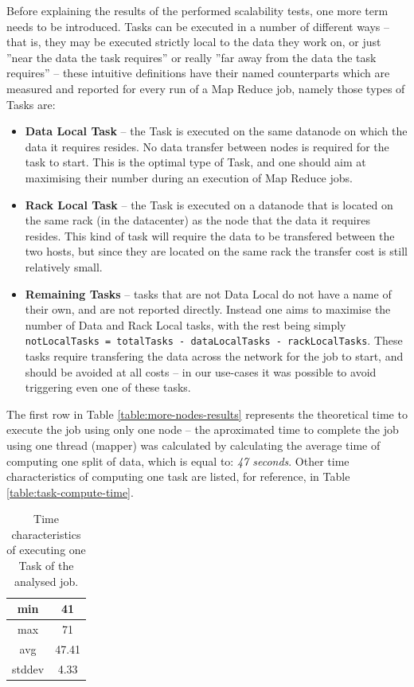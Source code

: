 Before explaining the results of the performed scalability tests, one more term needs to be introduced. Tasks can be executed in a number of different ways -- that is, they may be executed strictly local to the data they work on, or just ''near the data the task requires'' or really ''far away from the data the task requires'' -- these intuitive definitions have their named counterparts which are measured and reported for every run of a Map Reduce job, namely those types of Tasks are:

\begin{itemize}
  \item \textbf{Data Local Task} -- the Task is executed on the same datanode on which the data it requires resides. No data transfer between nodes is required for the task to start. This is the optimal type of Task, and one should aim at maximising their number during an execution of Map Reduce jobs.
  \item \textbf{Rack Local Task} -- the Task is executed on a datanode that is located on the same rack (in the datacenter) as the node that the data it requires resides. This kind of task will require the data to be transfered between the two hosts, but since they are located on the same rack the transfer cost is still relatively small.
  \item \textbf{Remaining Tasks} -- tasks that are not Data Local do not have a name of their own, and are not reported directly. Instead one aims to maximise the number of Data and Rack Local tasks, with the rest being simply \verb|notLocalTasks = totalTasks - dataLocalTasks - rackLocalTasks|. These tasks require transfering the data across the network for the job to start, and should be avoided at all costs -- in our use-cases it was possible to avoid triggering even one of these tasks.
\end{itemize}

The first row in Table \ref{table:more-nodes-results} represents the theoretical time to execute the job using only one node -- the aproximated time to complete the job using one thread (mapper) was calculated by calculating the average time of computing one split of data, which is equal to: \textit{47 seconds}. Other time characteristics of computing one task are listed, for reference, in Table \ref{table:task-compute-time}.

\begin{table}[hbt]
  \centering
  \begin{tabular}{|c|c|}
  \hline
    min    &   41     \\ \hline
    max	   &   71     \\ \hline
    avg	   &   47.41  \\ \hline
    stddev &   4.33   \\ \hline
  \end{tabular}
  \label{table:time-task}
  \caption{Time characteristics of executing one Task of the analysed job.}
\end{table}


